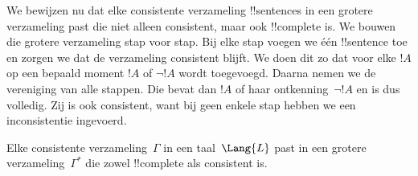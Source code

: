 \documentclass[openany]{memoir}
\begin{document}
\begingroup
\def\olfilename{OLP-0131}
\def\olfilepath{content/first-order-logic/completeness/}
\hypertarget{unit-OLP-0131}{}



      {}
      {}


\begin{explain}
We bewijzen nu dat elke consistente verzameling !!{sentence}s in een
grotere verzameling past die niet alleen consistent, maar ook
!!{complete} is. We bouwen die grotere verzameling stap voor stap. Bij
elke stap voegen we één !!{sentence} toe en zorgen we dat de verzameling
consistent blijft. We doen dit zo dat voor elke $!A$ op een bepaald
moment $!A$ of $\lnot !A$ wordt toegevoegd. Daarna nemen we de vereniging
van alle stappen. Die bevat dan $!A$ of haar ontkenning~$\lnot !A$ en is
dus volledig. Zij is ook consistent, want bij geen enkele stap hebben we
een inconsistentie ingevoerd.
\end{explain}

\begin{lem}
 Elke consistente verzameling~$\Gamma$ in een
taal~$\Lang{L}$ past in een grotere verzameling~$\Gamma^*$ die zowel
!!{complete} als consistent is.
\end{lem}
\end{document}
